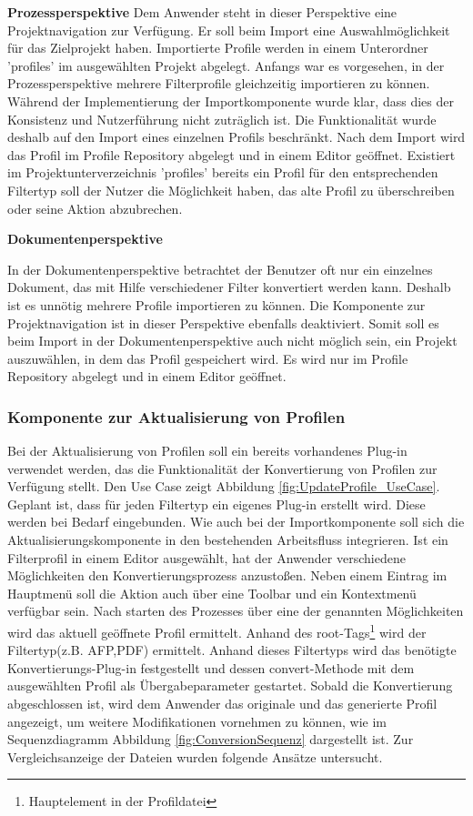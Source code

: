 {{{\textbf{Prozessperspektive}
 {Dem Anwender steht in dieser Perspektive eine Projektnavigation zur Verfügung. Er soll beim Import eine Auswahlmöglichkeit für das Zielprojekt haben. Importierte Profile werden in einem Unterordner 'profiles' im ausgewählten Projekt abgelegt. Anfangs war es vorgesehen, in der Prozessperspektive mehrere Filterprofile gleichzeitig importieren zu können. Während der Implementierung der Importkomponente wurde klar, dass dies der Konsistenz und Nutzerführung nicht zuträglich ist. Die Funktionalität wurde deshalb auf den Import eines einzelnen Profils beschränkt. Nach dem Import wird das Profil im Profile Repository abgelegt und in einem Editor geöffnet. Existiert im Projektunterverzeichnis 'profiles' bereits ein Profil für den entsprechenden Filtertyp soll der Nutzer die Möglichkeit haben, das alte Profil zu überschreiben oder seine Aktion abzubrechen. 
}


\textbf{Dokumentenperspektive} 
{In der Dokumentenperspektive betrachtet der Benutzer oft nur ein einzelnes Dokument, das mit Hilfe verschiedener Filter konvertiert werden kann. Deshalb ist es unnötig mehrere Profile importieren zu können. Die Komponente zur Projektnavigation ist in dieser Perspektive ebenfalls deaktiviert. Somit soll es beim Import in der Dokumentenperspektive auch nicht möglich sein, ein Projekt auszuwählen, in dem das Profil gespeichert wird. Es wird nur im Profile Repository abgelegt und in einem Editor geöffnet.


}



}

\subsubsection{Komponente zur Aktualisierung von Profilen}{
Bei der Aktualisierung von Profilen soll ein bereits vorhandenes Plug-in verwendet werden, das die Funktionalität der Konvertierung von Profilen zur Verfügung stellt. Den Use Case zeigt Abbildung \ref{fig:UpdateProfile_UseCase}. Geplant ist, dass für jeden Filtertyp ein eigenes Plug-in erstellt wird. Diese werden bei Bedarf eingebunden. Wie auch bei der Importkomponente soll sich die Aktualisierungskomponente in den bestehenden Arbeitsfluss integrieren. Ist ein Filterprofil in einem Editor ausgewählt, hat der Anwender verschiedene Möglichkeiten den Konvertierungsprozess anzustoßen. Neben einem Eintrag im Hauptmenü soll die Aktion auch über eine \gls{Toolbar} und ein Kontextmenü verfügbar sein. Nach starten des Prozesses über eine der genannten Möglichkeiten wird das aktuell geöffnete Profil ermittelt. Anhand des root-Tags\footnote{Hauptelement in der Profildatei} wird der Filtertyp(z.B. \ac{AFP},\ac{PDF}) ermittelt. Anhand dieses Filtertyps wird das benötigte Konvertierungs-Plug-in festgestellt und dessen convert-Methode mit dem ausgewählten Profil als Übergabeparameter gestartet. Sobald die Konvertierung abgeschlossen ist, wird dem Anwender das originale und das generierte Profil angezeigt, um weitere Modifikationen vornehmen zu können, wie im Sequenzdiagramm Abbildung \ref{fig:ConversionSequenz} dargestellt ist. Zur Vergleichsanzeige der Dateien wurden folgende Ansätze untersucht.

}}}
